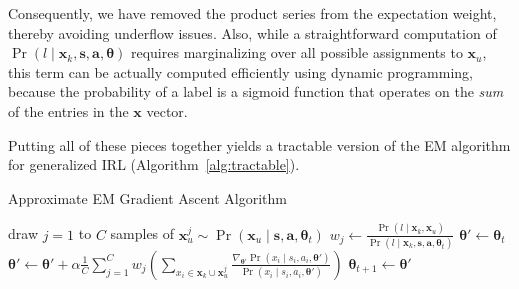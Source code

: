 \noindent
Consequently, we have removed the product series from the expectation
weight, thereby avoiding underflow issues. Also, while a
straightforward computation of
$\Pr(l \mid \bm{x}_k, \bm{s}, \bm{a}, \bm{\theta})$ requires
marginalizing over all possible assignments to $\bm{x}_u$, this term
can be actually computed efficiently using dynamic programming,
because the probability of a label is a sigmoid function that operates
on the \emph{sum\/} of the entries in the $\bm{x}$ vector.

Putting all of these pieces together yields a tractable version of the
EM algorithm for generalized IRL (Algorithm~\ref{alg:tractable}).

\begin{algorithm}
\caption{Approximate EM Gradient Ascent Algorithm}
\begin{algorithmic}
\State draw $j=1$ to $C$ samples of $\bm{x}_u^j \sim \Pr(\bm{x}_u \mid \bm{s}, \bm{a}, \bm{\theta}_t)$ 
\State $w_j \gets \frac{\Pr(l \mid \bm{x}_k, \bm{x}_u)}{\Pr(l \mid \bm{x}_k, \bm{s}, \bm{a}, \bm{\theta}_t)}$ 
\EndFor
\State $\bm{\theta}' \gets \bm{\theta}_t$
 
\State $\bm{\theta}' \gets \bm{\theta}' + \alpha \frac{1}{C} \sum_{j=1}^C w_j \left( \sum_{x_i \in \bm{x}_k \cup \bm{x}_u^j} \frac{\nabla_{\bm{\theta}'} \Pr(x_i \mid s_i, a_i, \bm{\theta}')}{\Pr(x_i \mid s_i, a_i, \bm{\theta}')} \right)$
\EndFor
\State $\bm{\theta}_{t+1} \gets \bm{\theta}'$
\EndFor
\end{algorithmic}
\label{alg:tractable}
\end{algorithm}

